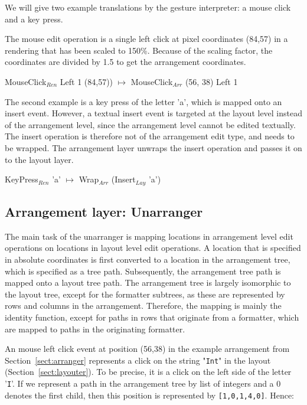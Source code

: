 We will give two example translations by the gesture interpreter: a mouse click and a key press. 

The mouse edit operation is a single left click at pixel coordinates (84,57) in a rendering that has been scaled to 150\%.
Because of the scaling factor, the coordinates are divided by 1.5 to get the arrangement coordinates.

\ttfamily
MouseClick$_{Ren}$ Left 1 (84,57)) $\mapsto$ MouseClick$_{Arr}$ (56, 38) Left 1\\
\rmfamily

The second example is a key press of the letter 'a', which is mapped onto an insert event. However, a textual insert event is targeted at the layout level instead of the arrangement level, since the arrangement level cannot be edited textually. The insert operation is therefore not of the arrangement edit type, and needs to be wrapped. The arrangement layer unwraps the insert operation and passes it on to the layout layer.

\ttfamily
KeyPress$_{Ren}$ 'a' $\mapsto$ Wrap$_{Arr}$ (Insert$_{Lay}$ 'a')
\rmfamily


%																
\subsection{Arrangement layer: Unarranger}

The main task of the unarranger is mapping locations in arrangement level edit operations on locations in layout level edit operations. A location that is specified in absolute coordinates is first converted to a location in the arrangement tree, which is specified as a tree path. Subsequently, the arrangement tree path is mapped onto a layout tree path. The arrangement tree is largely isomorphic to the layout tree, except for the formatter subtrees, as these are represented by rows and columns in the arrangement. Therefore, the mapping is mainly the identity function, except for paths in rows that originate from a formatter, which are mapped to paths in the originating formatter.

An mouse left click event at position (56,38) in the example arrangement from Section~\ref{sect:arranger} represents a click on the string "\verb|Int|" in the layout (Section~\ref{sect:layouter}). To be precise, it is a click on the left side of the letter '\verb|I|'. If we represent a path in the arrangement tree by list of integers and a 0 denotes the first child, then this position is represented by \verb|[1,0,1,4,0]|. Hence:

